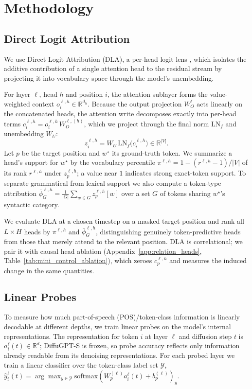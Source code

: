 \documentclass{article} %
\begin{document}
\section{Methodology}\label{sec:methodology}
\subsection{Direct Logit Attribution}\label{subsec:dta}
We use Direct Logit Attribution (DLA), a per-head logit lens \citep{nostalgebraist2020logitlens}, which isolates the additive contribution of a single attention head to the residual stream by projecting it into vocabulary space through the model's unembedding.

For layer $\ell$, head $h$ and position $i$, the attention sublayer forms the value-weighted context $o^{\ell,h}_i\in\mathbb{R}^{d_h}$. Because the output projection $W_O^\ell$ acts linearly on the concatenated heads, the attention write decomposes exactly into per-head terms $c^{\ell,h}_i = o^{\ell,h}_i\,W_O^{\ell,(h)}$, which we project through the final norm $\mathrm{LN}_f$ and unembedding $W_U$:
\begin{equation}
  z^{\ell,h}_i = W_U\,\mathrm{LN}_f\!\big(c^{\ell,h}_i\big)\in\mathbb{R}^{|V|}.
\end{equation}
Let $p$ be the target position and $w^\star$ its ground-truth token. We summarize a head's support for $w^\star$ by the vocabulary percentile $\pi^{\ell,h}=1-(r^{\ell,h}-1)/|V|$ of its rank $r^{\ell,h}$ under $z^{\ell,h}_p$; a value near $1$ indicates strong exact-token support. To separate grammatical from lexical support we also compute a token-type attribution $\bar{\phi}^{\ell,h}_{G}=\tfrac{1}{|G|}\sum_{w\in G} z^{\ell,h}_p[w]$ over a set $G$ of tokens sharing $w^\star$'s syntactic category.

We evaluate DLA at a chosen timestep on a masked target position and rank all $L\times H$ heads by $\pi^{\ell,h}$ and $\bar{\phi}^{\ell,h}_{G}$, distinguishing genuinely token-predictive heads from those that merely attend to the relevant position. DLA is correlational; we pair it with causal head ablation (Appendix~\ref{app:relation_heads}, Table~\ref{tab:mini_control_ablation}), which zeroes $c^{\ell,h}_p$ and measures the induced change in the same quantities.



\subsection{Linear Probes}\label{subsec:probes}
To measure how much part-of-speech (POS)/token-class information is linearly decodable at different depths, we train linear probes on the model's internal representations. The representation for token $i$ at layer $\ell$ and diffusion step $t$ is $a_i^\ell(t)\in\mathbb{R}^{d}$; DiffuGPT-S is frozen, so probe accuracy reflects only information already readable from its denoising representations. For each probed layer we train a linear classifier over the token-class label set $\mathcal{Y}$, $\hat{y}_i^\ell(t)=\arg\max_{y\in\mathcal{Y}}\mathrm{softmax}(W_p^{(\ell)}a_i^\ell(t)+b_p^{(\ell)})_y$.
\end{document}
